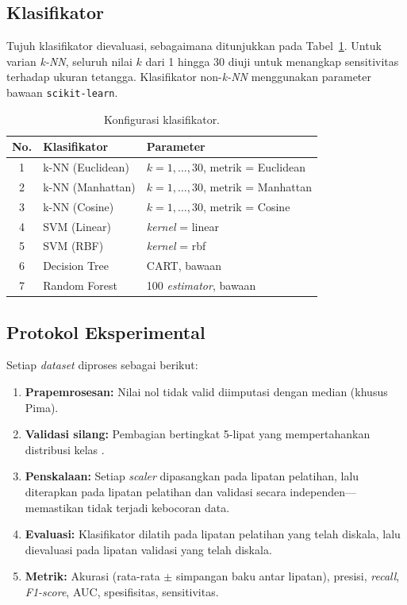 \documentclass[12pt,a4paper]{article}
\begin{document}
\subsection{Klasifikator}
\label{sec:classifiers}

Tujuh klasifikator dievaluasi, sebagaimana ditunjukkan pada
Tabel~\ref{tbl:classifiers}. Untuk varian \textit{k-NN}, seluruh nilai $k$ dari
1 hingga 30 diuji untuk menangkap sensitivitas terhadap ukuran tetangga.
Klasifikator non-\textit{k-NN} menggunakan parameter bawaan \texttt{scikit-learn}.

\begin{table}[ht]
\centering
\caption{Konfigurasi klasifikator.}
\label{tbl:classifiers}
\begin{tabular}{cll}
\toprule
No. & Klasifikator & Parameter \\
\midrule
1 & k-NN (Euclidean) & $k = 1,\dots,30$, metrik = Euclidean \\
2 & k-NN (Manhattan) & $k = 1,\dots,30$, metrik = Manhattan \\
3 & k-NN (Cosine)    & $k = 1,\dots,30$, metrik = Cosine \\
4 & SVM (Linear)     & \textit{kernel} = linear \\
5 & SVM (RBF)        & \textit{kernel} = rbf \\
6 & Decision Tree    & CART, bawaan \\
7 & Random Forest    & 100 \textit{estimator}, bawaan \\
\bottomrule
\end{tabular}
\end{table}

\subsection{Protokol Eksperimental}
\label{sec:protocol}

Setiap \textit{dataset} diproses sebagai berikut:
\begin{enumerate}
  \item \textbf{Prapemrosesan:} Nilai nol tidak valid diimputasi dengan median
  (khusus Pima).
  \item \textbf{Validasi silang:} Pembagian bertingkat 5-lipat yang
  mempertahankan distribusi kelas \cite{bates2023crossval}.
  \item \textbf{Penskalaan:} Setiap \textit{scaler} dipasangkan pada lipatan
  pelatihan, lalu diterapkan pada lipatan pelatihan dan validasi secara
  independen---memastikan tidak terjadi kebocoran data.
  \item \textbf{Evaluasi:} Klasifikator dilatih pada lipatan pelatihan yang
  telah diskala, lalu dievaluasi pada lipatan validasi yang telah diskala.
  \item \textbf{Metrik:} Akurasi (rata-rata $\pm$ simpangan baku antar lipatan),
  presisi, \textit{recall}, \textit{F1-score}, AUC, spesifisitas, sensitivitas.
\end{enumerate}
\end{document}
